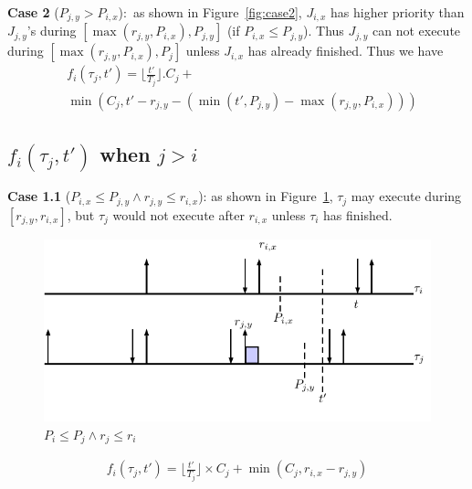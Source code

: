 \textbf{Case 2} ($P_{j,y}> P_{i,x}$):~as shown in  Figure~\ref{fig:case2}, $J_{i,x}$ has higher priority than $J_{j,y}$'s  during $[\max(r_{j,y},P_{i,x}),P_{j,y}]$ (if $P_{i,x}\leq P_{j,y}$). Thus  $J_{j,y}$ can not execute  during $[\max(r_{j,y},P_{i,x}),P_j]$ unless $J_{i,x}$ has already finished. Thus we have
	\begin{align*}
		&f_i(\tau_j,t')=\lfloor \frac{t'}{T_j}\rfloor.C_j +
\\&\min\left(C_j,\!t'\!-\!r_{j,y}\!-\!\left(\min(t'\!,\!P_{j,y})\!-\!\max(r_{j,y},\!P_{i,x})\right)\right)
		\end{align*}




% 
\subsection{$f_i(\tau_j,t')$ when $j> i$}
 
\textbf{Case 1.1} ($P_{i,x}\leq P_{j,y}\wedge r_{j,y}\leq r_{i,x}$): as shown in  Figure~\ref{fig:case3}, $\tau_j$ may execute during $[r_{j,y},r_{i,x}]$, but $\tau_j$ would not execute after $r_{i,x}$  unless $\tau_i$ has finished.

	\begin{figure}[h!]
 \centering
\includegraphics[scale=0.7]{Figure/C3}  
\caption{$P_i\leq P_j\wedge r_j\leq r_i$}
  \label{fig:case3}
\end{figure}
		\begin{align*}
		f_i(\tau_j,t')=\lfloor \frac{t'}{T_j}\rfloor\times C_j+\min(C_j,r_{i,x}-r_{j,y})
	\end{align*}




